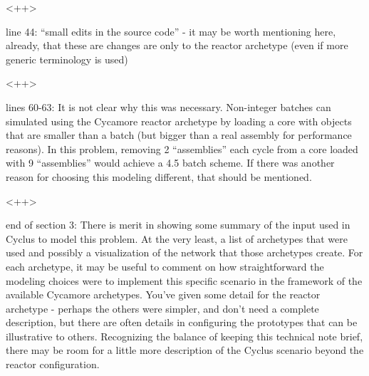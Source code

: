 \documentclass[answers,11pt]{exam}
\begin{document}
\begin{questions}
        \begin{solution}
        <++>
        \end{solution}

        \question line 44: ``small edits in the source code'' - it may be worth 
        mentioning here, already, that these are changes are only to the 
        reactor archetype (even if more generic terminology is used)

        \begin{solution}
        <++>
        \end{solution}

        \question lines 60-63: It is not clear why this was necessary. 
        Non-integer batches can simulated using the Cycamore reactor archetype 
        by loading a core with objects that are smaller than a batch (but 
        bigger than a real assembly for performance reasons).  In this problem, 
        removing 2 ``assemblies'' each cycle from a core loaded with 9 
        ``assemblies'' would achieve a 4.5 batch scheme.  If there was another 
        reason for choosing this modeling different, that should be mentioned.

        \begin{solution}
        <++>
        \end{solution}

        \question end of section 3: There is merit in showing some summary of 
        the input used in Cyclus to model this problem.  At the very least, a 
        list of archetypes that were used and possibly a visualization of the 
        network that those archetypes create.  For each archetype, it may be 
        useful to comment on how straightforward the modeling choices were to 
        implement this specific scenario in the framework of the available 
        Cycamore archetypes.  You've given some detail for the reactor 
        archetype - perhaps the others were simpler, and don't need a complete 
        description, but there are often details in configuring the prototypes 
        that can be illustrative to others.  Recognizing the balance of keeping 
        this technical note brief, there may be room for a little more 
        description of the Cyclus scenario beyond the reactor configuration.


\end{questions}
\end{document}
